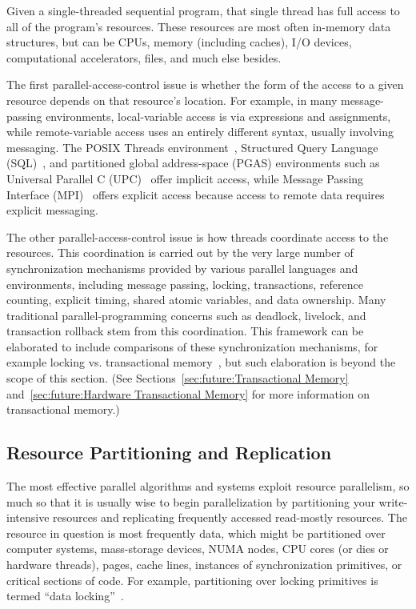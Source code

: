 Given a single-threaded sequential program, that single
thread has full access to all of the program's resources.
These resources are most often in-memory data structures, but can be CPUs,
memory (including caches), I/O devices, computational accelerators, files,
and much else besides.

The first parallel-access-control issue is whether the form of the access to
a given resource depends on that resource's location.
For example, in many message-passing environments, local-variable
access is via expressions and assignments,
while remote-variable access uses an entirely different
syntax, usually involving messaging.
The POSIX Threads environment~\cite{OpenGroup1997pthreads},
Structured Query Language (SQL)~\cite{DIS9075SQL92}, and
partitioned global address-space (PGAS) environments
such as Universal Parallel C (UPC)~\cite{ElGhazawi2003UPC}
offer implicit access,
while Message Passing Interface (MPI)~\cite{MPIForum2008} offers
explicit access because access to remote data requires explicit
messaging.

The other parallel-access-control issue is how threads coordinate
access to the resources.
This coordination is carried out by
the very large number of synchronization mechanisms
provided by various parallel languages and environments,
including message passing, locking, transactions,
reference counting, explicit timing, shared atomic variables, and data
ownership.
Many traditional parallel-programming concerns such as deadlock,
livelock, and transaction rollback stem from this coordination.
This framework can be elaborated to include comparisons
of these synchronization mechanisms, for example locking vs. transactional
memory~\cite{McKenney2007PLOSTM}, but such elaboration is beyond the
scope of this section.
(See
Sections~\ref{sec:future:Transactional Memory}
and~\ref{sec:future:Hardware Transactional Memory}
for more information on transactional memory.)

\subsection{Resource Partitioning and Replication}
\label{sec:Resource Partitioning and Replication}

The most effective parallel algorithms and systems exploit resource
parallelism, so much so that it is
usually wise to begin parallelization by partitioning your write-intensive
resources and replicating frequently accessed read-mostly resources.
The resource in question is most frequently data, which might be
partitioned over computer systems, mass-storage devices, NUMA nodes,
CPU cores (or dies or hardware threads), pages, cache lines, instances
of synchronization primitives, or critical sections of code.
For example, partitioning over locking primitives is termed
``data locking''~\cite{Beck85}.

